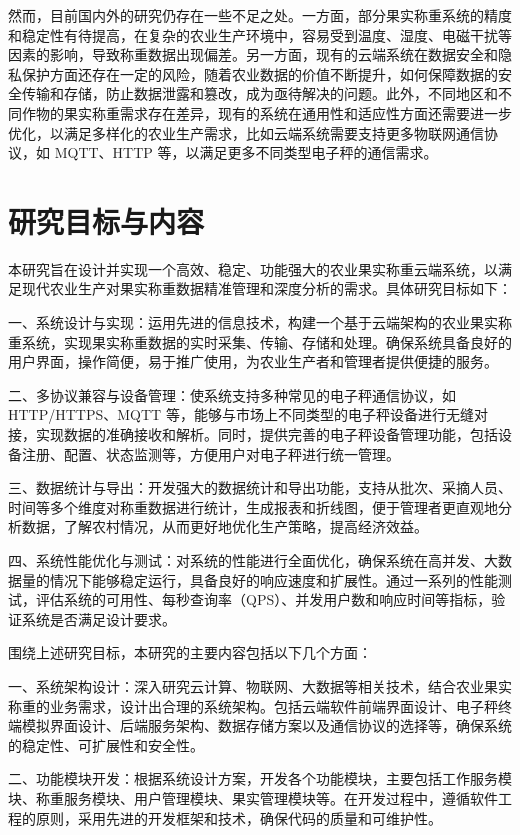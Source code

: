 \documentclass{xduugthesis}
\begin{document}
然而，目前国内外的研究仍存在一些不足之处。一方面，部分果实称重系统的精度和稳定性有待提高，在复杂的农业生产环境中，容易受到温度、湿度、电磁干扰等因素的影响，导致称重数据出现偏差\cite{汤建华2018}。另一方面，现有的云端系统在数据安全和隐私保护方面还存在一定的风险，随着农业数据的价值不断提升，如何保障数据的安全传输和存储，防止数据泄露和篡改，成为亟待解决的问题。此外，不同地区和不同作物的果实称重需求存在差异，现有的系统在通用性和适应性方面还需要进一步优化，以满足多样化的农业生产需求，比如云端系统需要支持更多物联网通信协议，如 MQTT、HTTP 等，以满足更多不同类型电子秤的通信需求。

\section{研究目标与内容}

本研究旨在设计并实现一个高效、稳定、功能强大的农业果实称重云端系统，以满足现代农业生产对果实称重数据精准管理和深度分析的需求。具体研究目标如下：

一、系统设计与实现：运用先进的信息技术，构建一个基于云端架构的农业果实称重系统，实现果实称重数据的实时采集、传输、存储和处理。确保系统具备良好的用户界面，操作简便，易于推广使用，为农业生产者和管理者提供便捷的服务。

二、多协议兼容与设备管理：使系统支持多种常见的电子秤通信协议，如 HTTP/HTTPS、MQTT 等，能够与市场上不同类型的电子秤设备进行无缝对接，实现数据的准确接收和解析。同时，提供完善的电子秤设备管理功能，包括设备注册、配置、状态监测等，方便用户对电子秤进行统一管理。

三、数据统计与导出：开发强大的数据统计和导出功能，支持从批次、采摘人员、时间等多个维度对称重数据进行统计，生成报表和折线图，便于管理者更直观地分析数据，了解农村情况，从而更好地优化生产策略，提高经济效益。

四、系统性能优化与测试：对系统的性能进行全面优化，确保系统在高并发、大数据量的情况下能够稳定运行，具备良好的响应速度和扩展性。通过一系列的性能测试，评估系统的可用性、每秒查询率（QPS）、并发用户数和响应时间等指标，验证系统是否满足设计要求。

围绕上述研究目标，本研究的主要内容包括以下几个方面：

一、系统架构设计：深入研究云计算、物联网、大数据等相关技术，结合农业果实称重的业务需求，设计出合理的系统架构。包括云端软件前端界面设计、电子秤终端模拟界面设计、后端服务架构、数据存储方案以及通信协议的选择等，确保系统的稳定性、可扩展性和安全性。

二、功能模块开发：根据系统设计方案，开发各个功能模块，主要包括工作服务模块、称重服务模块、用户管理模块、果实管理模块等。在开发过程中，遵循软件工程的原则，采用先进的开发框架和技术，确保代码的质量和可维护性。
\end{document}
